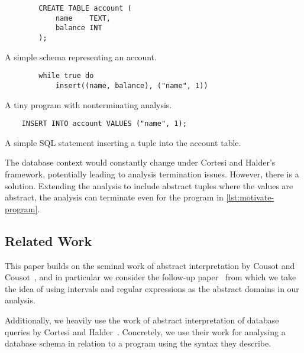 \begin{listing}
    \begin{verbatim}
        CREATE TABLE account (
            name    TEXT,
            balance INT
        );
    \end{verbatim}
    \caption{A simple schema representing an account.}
    \label{lst:motivate-sql}
\end{listing}


\begin{listing}
    \begin{verbatim}
        while true do
            insert((name, balance), ("name", 1))
    \end{verbatim}
    \caption{A tiny program with nonterminating analysis.}
    \label{lst:motivate-program}
\end{listing}

\begin{listing}
    \begin{verbatim}
    INSERT INTO account VALUES ("name", 1);
    \end{verbatim}
    \caption{A simple SQL statement inserting a tuple into the account table.}
    \label{lst:motivate-sql-insert}
\end{listing}


The database context would constantly change under Cortesi and Halder's framework, potentially leading to analysis termination issues.
However, there is a solution.
Extending the analysis to include abstract tuples where the values are abstract, the analysis can terminate even for the program in \autoref{lst:motivate-program}.



\subsection{Related Work}\label{subsec:related-work}
This paper builds on the seminal work of abstract interpretation by Cousot and Cousot~\cite{cousot_abstract_1977}, and in particular we consider the follow-up paper~\cite{cousot_abstract_1996} from which we take the idea of using intervals and regular expressions as the abstract domains in our analysis.

Additionally, we heavily use the work of abstract interpretation of database queries by Cortesi and Halder~\cite{halder_abstract_2012}.
Concretely, we use their work for analysing a database schema in relation to a program using the syntax they describe.

